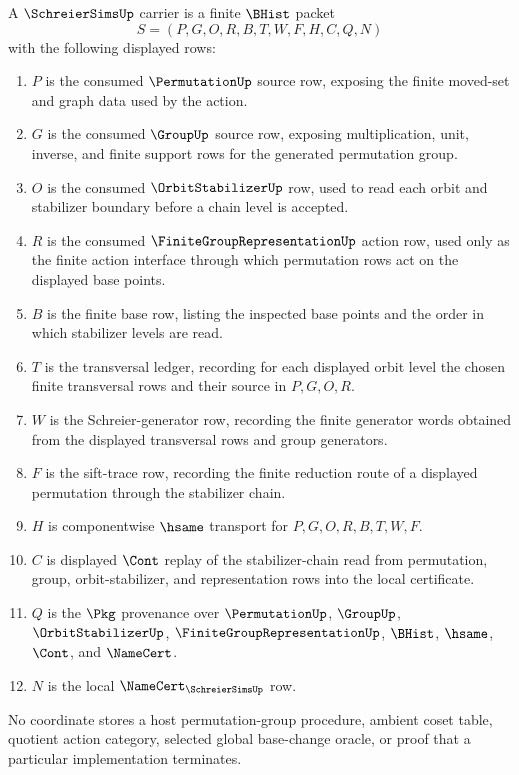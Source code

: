 \begin{definition}
\label{def:schreier-sims-carrier}
A $\SchreierSimsUp$ carrier is a finite $\BHist$ packet
$$
S=(P,G,O,R,B,T,W,F,H,C,Q,N)
$$
with the following displayed rows:
\begin{enumerate}
\item $P$ is the consumed $\PermutationUp$ source row, exposing the finite moved-set and graph data used by the action.
\item $G$ is the consumed $\GroupUp$ source row, exposing multiplication, unit, inverse, and finite support rows for the generated permutation group.
\item $O$ is the consumed $\OrbitStabilizerUp$ row, used to read each orbit and stabilizer boundary before a chain level is accepted.
\item $R$ is the consumed $\FiniteGroupRepresentationUp$ action row, used only as the finite action interface through which permutation rows act on the displayed base points.
\item $B$ is the finite base row, listing the inspected base points and the order in which stabilizer levels are read.
\item $T$ is the transversal ledger, recording for each displayed orbit level the chosen finite transversal rows and their source in $P,G,O,R$.
\item $W$ is the Schreier-generator row, recording the finite generator words obtained from the displayed transversal rows and group generators.
\item $F$ is the sift-trace row, recording the finite reduction route of a displayed permutation through the stabilizer chain.
\item $H$ is componentwise $\hsame$ transport for $P,G,O,R,B,T,W,F$.
\item $C$ is displayed $\Cont$ replay of the stabilizer-chain read from permutation, group, orbit-stabilizer, and representation rows into the local certificate.
\item $Q$ is the $\Pkg$ provenance over $\PermutationUp$, $\GroupUp$, $\OrbitStabilizerUp$, $\FiniteGroupRepresentationUp$, $\BHist$, $\hsame$, $\Cont$, and $\NameCert$.
\item $N$ is the local $\NameCert_{\SchreierSimsUp}$ row.
\end{enumerate}
No coordinate stores a host permutation-group procedure, ambient coset table, quotient action category, selected global base-change oracle, or proof that a particular implementation terminates.
\end{definition}

